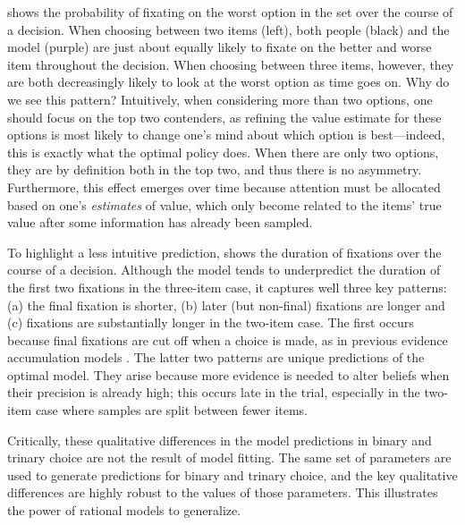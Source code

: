 \documentclass[11pt,a4paperpaper,]{article}
\begin{document}
 shows the probability of fixating on the worst option in the set over the course of a decision. When choosing between two items (left), both people (black) and the model (purple) are just about equally likely to fixate on the better and worse item throughout the decision. When choosing between three items, however, they are both decreasingly likely to look at the worst option as time goes on. Why do we see this pattern? Intuitively, when considering more than two options, one should focus on the top two contenders, as refining the value estimate for these options is most likely to change one's mind about which option is best---indeed, this is exactly what the optimal policy does. When there are only two options, they are by definition both in the top two, and thus there is no asymmetry. Furthermore, this effect emerges over time because attention must be allocated based on one's \emph{estimates} of value, which only become related to the items' true value after some information has already been sampled. 


To highlight a less intuitive prediction,  shows the duration of fixations over the course of a decision. Although the model tends to underpredict the duration of the first two fixations in the three-item case, it captures well three key patterns: (a) the final fixation is shorter, (b) later (but non-final) fixations are longer and (c) fixations are substantially longer in the two-item case. The first occurs because final fixations are cut off when a choice is made, as in previous evidence accumulation models \citep{krajbich2010visual}. The latter two patterns are unique predictions of the optimal model. They arise because more evidence is needed to alter beliefs when their precision is already high; this occurs late in the trial, especially in the two-item case where samples are split between fewer items.

Critically, these qualitative differences in the model predictions in binary and trinary choice are not the result of model fitting. The same set of parameters are used to generate predictions for binary and trinary choice, and the key qualitative differences are highly robust to the values of those parameters. This illustrates the power of rational models to generalize.
\end{document}
